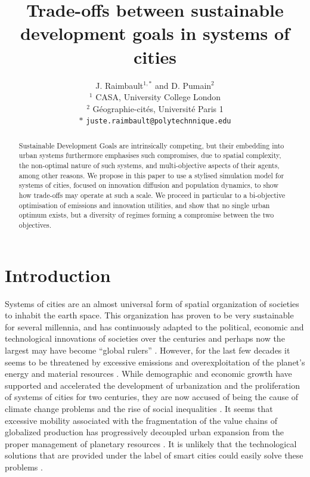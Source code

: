 \documentclass{article}
\title{Trade-offs between sustainable development goals in systems of cities}
\author{J. Raimbault$^{1,\ast}$ and D. Pumain$^{2}$\medskip\\
$^{1}$ CASA, University College London\\
$^{2}$ G{\'e}ographie-cit{\'e}s, Universit{\'e} Paris 1\medskip\\
$\ast$ \texttt{juste.raimbault@polytechnnique.edu}
}
\date{}
\begin{document}
\maketitle

\begin{abstract}
	Sustainable Development Goals are intrinsically competing, but their embedding into urban systems furthermore emphasises such compromises, due to spatial complexity, the non-optimal nature of such systems, and multi-objective aspects of their agents, among other reasons. We propose in this paper to use a stylised simulation model for systems of cities, focused on innovation diffusion and population dynamics, to show how trade-offs may operate at such a scale. We proceed in particular to a bi-objective optimisation of emissions and innovation utilities, and show that no single urban optimum exists, but a diversity of regimes forming a compromise between the two objectives.
\end{abstract}


\section{Introduction}

Systems of cities are an almost universal form of spatial organization of societies to inhabit the earth space. This organization has proven to be very sustainable for several millennia, and has continuously adapted to the political, economic and technological innovations of societies over the centuries \cite{pumain2020theories} and perhaps now the largest may have become ``global rulers'' \cite{glaeser2020urban}. However, for the last few decades it seems to be threatened by excessive emissions and overexploitation of the planet's energy and material resources \cite{nijkamp2014sustainable,kourtit2020global}. While demographic and economic growth have supported and accelerated the development of urbanization and the proliferation of systems of cities for two centuries, they are now accused of being the cause of climate change problems and the rise of social inequalities \cite{davis2006planet,glaeser2009inequality}. It seems that excessive mobility associated with the fragmentation of the value chains of globalized production has progressively decoupled urban expansion from the proper management of planetary resources \cite{rozenblat2018urban}. It is unlikely that the technological solutions that are provided under the label of smart cities could easily solve these problems \cite{caragliu2011smart,kourtit2020global}.
\end{document}
